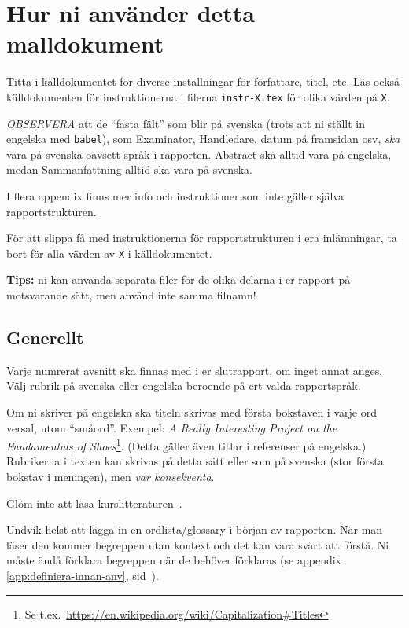 \section*{Hur ni använder detta malldokument}
Titta i källdokumentet för diverse inställningar för författare, titel, etc. Läs också käll\-doku\-men\-ten för instruktionerna i filerna \verb|instr-X.tex| för olika värden på \verb|X|.

\emph{OBSERVERA} att de ``fasta fält'' som blir på svenska (trots att ni ställt in engelska med \texttt{babel}), som Examinator, Handledare, datum på framsidan osv, \emph{ska} vara på svenska oavsett språk i rapporten. Abstract ska alltid vara på engelska, medan Sammanfattning alltid ska vara på svenska.

I flera appendix finns mer info och instruktioner som inte gäller själva rapportstrukturen.

För att slippa få med instruktionerna för rapportstrukturen i era inlämningar, ta bort \verb|| för alla värden av \verb|X|
i källdokumentet.

\textbf{Tips:} ni kan använda separata filer för de olika delarna i er rapport på motsvarande sätt, men använd inte samma filnamn!

\subsection*{Generellt}
Varje numrerat avsnitt ska finnas med i er slutrapport, om inget annat anges.  
Välj rubrik på svenska eller engelska beroende på ert valda rapportspråk.

Om ni skriver på engelska ska titeln skrivas med första bokstaven i varje ord versal, utom ``småord''. Exempel: \emph{A Really Interesting Project on the Fundamentals of Shoes}\footnote{Se t.ex.~\url{https://en.wikipedia.org/wiki/Capitalization\#Titles}}.  (Detta gäller även titlar i referenser på engelska.)
Rubrikerna i texten kan skrivas på detta sätt eller som på svenska (stor första bokstav i meningen), men \emph{var konsekventa}.

Glöm inte att läsa kurslitteraturen~\cite{dawson:projects-in-computing,dawson:projects-in-computing-old}.

Undvik helst att lägga in en ordlista/glossary i början av rapporten. När man läser den kommer begreppen utan kontext och det kan vara svårt att förstå. Ni måste ändå förklara begreppen när de behöver förklaras (se appendix \ref{app:definiera-innan-anv}, sid~\pageref{app:definiera-innan-anv}).

